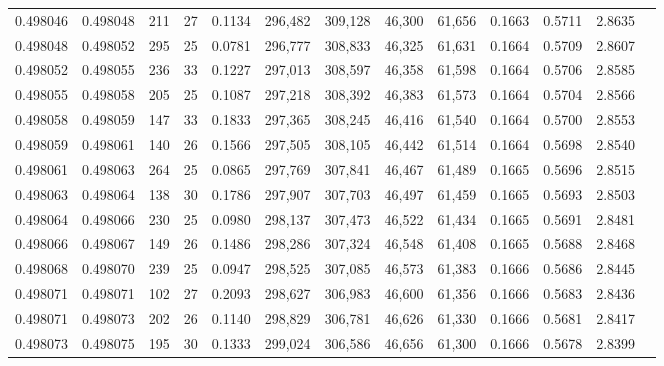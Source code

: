 \begin{tabular}{rrrrrrrrrrrrr}
0.498046 & 0.498048 & 211 &  27 &                                     0.1134 & 296,482 & 309,128 &  46,300 &  61,656 & 0.1663 & 0.5711 & 2.8635 \\
0.498048 & 0.498052 & 295 &  25 &                                     0.0781 & 296,777 & 308,833 &  46,325 &  61,631 & 0.1664 & 0.5709 & 2.8607 \\
0.498052 & 0.498055 & 236 &  33 &                                     0.1227 & 297,013 & 308,597 &  46,358 &  61,598 & 0.1664 & 0.5706 & 2.8585 \\
0.498055 & 0.498058 & 205 &  25 &                                     0.1087 & 297,218 & 308,392 &  46,383 &  61,573 & 0.1664 & 0.5704 & 2.8566 \\
0.498058 & 0.498059 & 147 &  33 &                                     0.1833 & 297,365 & 308,245 &  46,416 &  61,540 & 0.1664 & 0.5700 & 2.8553 \\
0.498059 & 0.498061 & 140 &  26 &                                     0.1566 & 297,505 & 308,105 &  46,442 &  61,514 & 0.1664 & 0.5698 & 2.8540 \\
0.498061 & 0.498063 & 264 &  25 &                                     0.0865 & 297,769 & 307,841 &  46,467 &  61,489 & 0.1665 & 0.5696 & 2.8515 \\
0.498063 & 0.498064 & 138 &  30 &                                     0.1786 & 297,907 & 307,703 &  46,497 &  61,459 & 0.1665 & 0.5693 & 2.8503 \\
0.498064 & 0.498066 & 230 &  25 &                                     0.0980 & 298,137 & 307,473 &  46,522 &  61,434 & 0.1665 & 0.5691 & 2.8481 \\
0.498066 & 0.498067 & 149 &  26 &                                     0.1486 & 298,286 & 307,324 &  46,548 &  61,408 & 0.1665 & 0.5688 & 2.8468 \\
0.498068 & 0.498070 & 239 &  25 &                                     0.0947 & 298,525 & 307,085 &  46,573 &  61,383 & 0.1666 & 0.5686 & 2.8445 \\
0.498071 & 0.498071 & 102 &  27 &                                     0.2093 & 298,627 & 306,983 &  46,600 &  61,356 & 0.1666 & 0.5683 & 2.8436 \\
0.498071 & 0.498073 & 202 &  26 &                                     0.1140 & 298,829 & 306,781 &  46,626 &  61,330 & 0.1666 & 0.5681 & 2.8417 \\
0.498073 & 0.498075 & 195 &  30 &                                     0.1333 & 299,024 & 306,586 &  46,656 &  61,300 & 0.1666 & 0.5678 & 2.8399 \\

\end{tabular}
